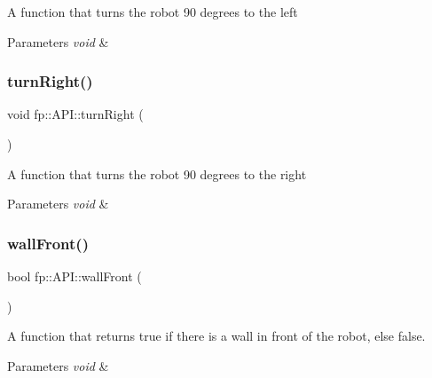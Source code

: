 A function that turns the robot 90 degrees to the left 
\begin{DoxyParams}{Parameters}
{\em void} & \\
\hline
\end{DoxyParams}
\mbox{\label{classfp_1_1_a_p_i_ac346f1c3ae7a39829c16681be2f25e92}} 
\subsubsection{\texorpdfstring{turn\+Right()}{turnRight()}}
{\footnotesize\ttfamily void fp\+::\+A\+P\+I\+::turn\+Right (\begin{DoxyParamCaption}{ }\end{DoxyParamCaption})\hspace{0.3cm}{\ttfamily [static]}}

A function that turns the robot 90 degrees to the right 
\begin{DoxyParams}{Parameters}
{\em void} & \\
\hline
\end{DoxyParams}
\mbox{\label{classfp_1_1_a_p_i_a52c23ca6b94cd561727e63c4a568bb86}} 
\subsubsection{\texorpdfstring{wall\+Front()}{wallFront()}}
{\footnotesize\ttfamily bool fp\+::\+A\+P\+I\+::wall\+Front (\begin{DoxyParamCaption}{ }\end{DoxyParamCaption})\hspace{0.3cm}{\ttfamily [static]}}

A function that returns true if there is a wall in front of the robot, else false. 
\begin{DoxyParams}{Parameters}
{\em void} & \\
\hline
\end{DoxyParams}
\mbox{\label{classfp_1_1_a_p_i_a49efec34a5521b6a7f202759f7f758d2}} 
